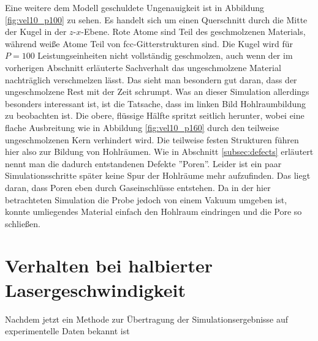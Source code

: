 		Eine weitere dem Modell geschuldete Ungenauigkeit ist in Abbildung \ref{fig:vel10_p100}
		zu sehen. Es handelt sich um einen Querschnitt durch die Mitte der Kugel in der
		$z$-$x$-Ebene. Rote Atome sind Teil des geschmolzenen Materials, während weiße Atome Teil
		von fcc-Gitterstrukturen sind. Die Kugel wird für $P = 100$ Leistungseinheiten nicht
		vollständig geschmolzen, auch wenn der im vorherigen Abschnitt erläuterte Sachverhalt das
		ungeschmolzene Material nachträglich verschmelzen lässt. Das sieht man besondern gut
		daran, dass der ungeschmolzene Rest mit der Zeit schrumpt. Was an dieser Simulation
		allerdings besonders interessant ist, ist die Tatsache, dass im linken Bild
		Hohlraumbildung zu beobachten ist. Die obere, flüssige Hälfte spritzt seitlich herunter,
		wobei eine flache Ausbreitung wie in Abbildung \ref{fig:vel10_p160} durch den teilweise
		ungeschmolzenen Kern verhindert wird. Die teilweise festen Strukturen führen hier also zur
		Bildung von Hohlräumen. Wie in Abschnitt \ref{subsec:defects} erläutert nennt man die
		dadurch entstandenen Defekte ''Poren''. Leider ist ein paar Simulationsschritte später
		keine Spur der Hohlräume mehr aufzufinden. Das liegt daran, dass Poren eben durch
		Gaseinschlüsse entstehen. Da in der hier betrachteten Simulation die Probe jedoch von
		einem Vakuum umgeben ist, konnte umliegendes Material einfach den Hohlraum eindringen
		und die Pore so schließen.


\section{Verhalten bei halbierter Lasergeschwindigkeit}
		Nachdem jetzt ein Methode zur Übertragung der Simulationsergebnisse auf experimentelle
		Daten bekannt ist
